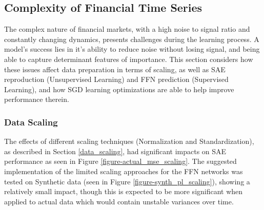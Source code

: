 \documentclass[a4paper,11pt,oneside]{article}
\theoremstyle{plain}
\theoremstyle{definition}
\begin{document}
	
	
	
	
	
	
	\newpage
	
	\subsection{Complexity of Financial Time Series}\label{results_finance_data}
	
	The complex nature of financial markets, with a high noise to signal ratio and constantly changing dynamics, presents challenges during the learning process. A model's success lies in it's ability to reduce noise without losing signal, and being able to capture determinant features of importance. This section considers how these issues affect data preparation in terms of scaling, as well as SAE reproduction (Unsupervised Learning) and FFN prediction (Supervised Learning), and how SGD learning optimizations are able to help improve performance therein.
	
	\subsubsection{Data Scaling}
	
	The effects of different scaling techniques (Normalization and Standardization), as described in Section \ref{data_scaling}, had significant impacts on SAE performance as seen in Figure \ref{figure-actual_mse_scaling}. The suggested implementation of the limited scaling approaches for the FFN networks was tested on Synthetic data (seen in Figure \ref{figure-synth_pl_scaling}), showing a relatively small impact, though this is expected to be more significant when applied to actual data which would contain unstable variances over time.
		
\end{document}
